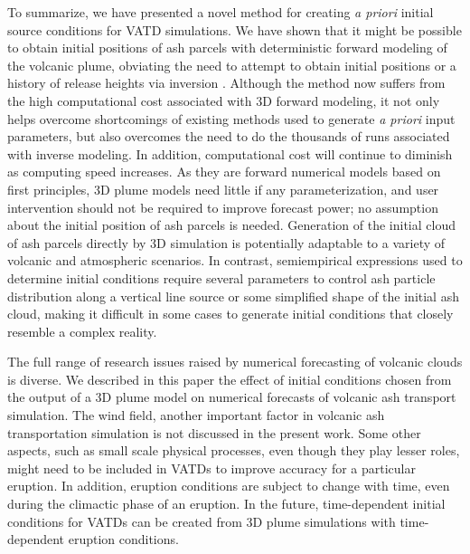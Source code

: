 \documentclass[draft,linenumbers]{agujournal2019}
\begin{document}
To summarize, we have presented a novel method for creating \textit{a priori} initial source conditions for VATD simulations. We have shown that it might be possible to obtain initial positions of ash parcels with deterministic forward modeling of the volcanic plume, obviating the need to attempt to obtain initial positions or a history of release heights via inversion \citep{stohl2011determination}. Although the method now suffers from the high computational cost associated with 3D forward modeling, it not only helps overcome shortcomings of existing methods used to generate \textit{a priori} input parameters, but also overcomes the need to do the thousands of runs associated with inverse modeling.  In addition, computational cost will continue to diminish as computing speed increases.  As they are forward numerical models based on first principles, 3D plume models need little if any parameterization, and user intervention should not be required to improve forecast power; no assumption about the initial position of ash parcels is needed. Generation of the initial cloud of ash parcels directly by 3D simulation is potentially adaptable to a variety of volcanic and atmospheric scenarios.  In contrast, semiempirical expressions used to determine initial conditions require several parameters to control ash particle distribution along a vertical line source or some simplified shape of the initial ash cloud, making it difficult in some cases to generate initial conditions that closely resemble a complex reality.

The full range of research issues raised by numerical forecasting of volcanic clouds is diverse. We described in this paper the effect of initial conditions chosen from the output of a 3D plume model on numerical forecasts of volcanic ash transport simulation.  The wind field, another important factor in volcanic ash transportation simulation is not discussed in the present work. Some other aspects, such as small scale physical processes, even though they play lesser roles, might need to be included in VATDs to improve accuracy for a particular eruption. In addition, eruption conditions are subject to change with time, even during the climactic phase of an eruption.  In the future, time-dependent initial conditions for VATDs can be created from 3D plume simulations with time-dependent eruption conditions.



\end{document}
